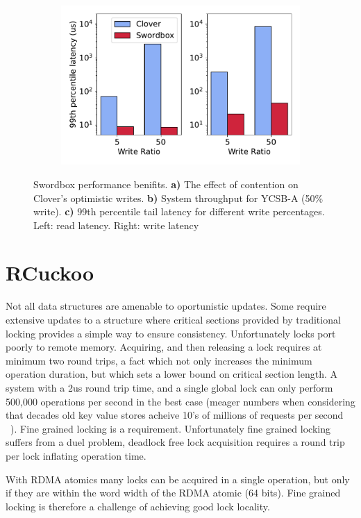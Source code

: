 \begin{figure}[t!]
\begin{subfigure}{.33\textwidth}
      \centering
      \includegraphics[width=.9\linewidth]{fig/99th_latency.pdf}
    \end{subfigure}

    \caption{Swordbox performance benifits. \textbf{a)} The effect of contention on
    Clover's optimistic writes. \textbf{b)} System throughput
    for YCSB-A (50\% write). \textbf{c)} 99th percentile tail
    latency for different write percentages. Left: read
    latency. Right: write latency}
        
    \label{fig:swordbox}
\end{figure}

\section{RCuckoo}

Not all data structures are amenable to oportunistic
updates. Some require extensive updates to a structure where
critical sections provided by traditional locking provides a
simple way to ensure consistency. Unfortunately locks port
poorly to remote memory. 
Acquiring, and then releasing a lock requires at minimum two
round trips, a fact which not only increases the minimum
operation duration, but which sets a lower bound on critical
section length. A system with a 2us round trip time, and a
single global lock can only perform 500,000 operations per
second in the best case (meager numbers when considering that
decades old key value stores acheive 10's of millions of
requests per second ~\cite{herd}). Fine grained locking is a
requirement.  Unfortunately fine grained locking suffers from
a duel problem, deadlock free lock acquisition requires a
round trip per lock inflating operation time. 

With RDMA atomics many locks can be acquired in a single
operation, but only if they are within the word width of the
RDMA atomic (64 bits). Fine grained locking is therefore a
challenge of achieving good lock locality.

